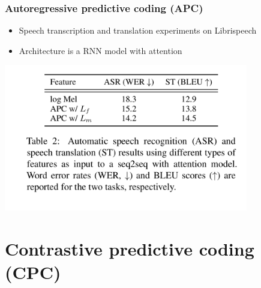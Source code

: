 \documentclass[table]{beamer}
\begin{document}

\begin{frame}
\frametitle{Autoregressive predictive coding (APC)}
\begin{itemize}
\item Speech transcription and translation experiments on Librispeech
\item Architecture is a RNN model with attention
\end{itemize} 
\begin{center}
	\includegraphics[width=0.8\textwidth]{APCexp}
\end{center}

\end{frame}




\section{Contrastive predictive coding (CPC)}
\end{document}
